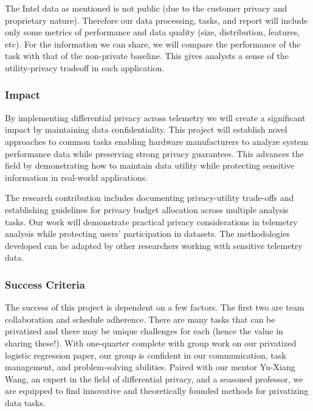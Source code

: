 \documentclass[12pt,letterpaper]{article}
\begin{document}
\begin{table}[h]
The Intel data as mentioned is not public (due to the customer privacy and proprietary nature). Therefore our data processing, tasks, and report will include only some metrics of performance and data quality (size, distribution, features, etc). For the information we can share, we will compare the performance of the task with that of the non-private baseline. This gives analysts a sense of the utility-privacy tradeoff in each application. 

\subsubsection{Impact}

By implementing differential privacy across telemetry we will create a significant impact by maintaining data confidentiality. This project will establish novel approaches to common tasks enabling hardware manufacturers to analyze system performance data while preserving strong privacy guarantees. This advances the field by demonstrating how to maintain data utility while protecting sensitive information in real-world applications. 

The research contribution includes documenting privacy-utility trade-offs and establishing guidelines for privacy budget allocation across multiple analysis tasks. Our work will demonstrate practical privacy considerations in telemetry analysis while protecting users’ participation in datasets. The methodologies developed can be adapted by other researchers working with sensitive telemetry data. 

\subsubsection{Success Criteria}

The success of this project is dependent on a few factors. The first two are team collaboration and schedule adherence. There are many tasks that can be privatized and there may be unique challenges for each (hence the value in sharing these!). With one-quarter complete with group work on our privatized logistic regression paper, our group is confident in our communication, task management, and problem-solving abilities. Paired with our mentor Yu-Xiang Wang, an expert in the field of differential privacy, and a seasoned professor, we are equipped to find innovative and theoretically founded methods for privatizing data tasks.


\end{table}
\end{document}
